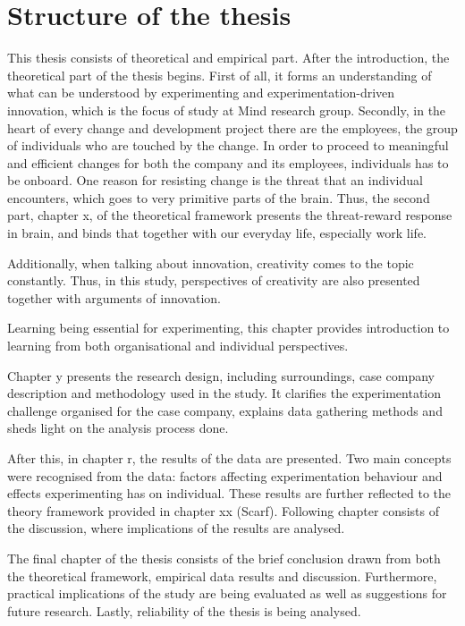 \section{Structure of the thesis}
This thesis consists of theoretical and empirical part. After the introduction, the theoretical part of the thesis begins. First of all, it forms an understanding 
of what can be understood by experimenting and experimentation-driven innovation, which is the focus of study at Mind research group. Secondly, in the heart of 
every change and development project there are the employees, the group of individuals who are touched by the change. In order to proceed to meaningful and efficient 
changes for both the company and its employees, individuals has to be onboard.  One reason for resisting change is the threat that an individual encounters, which 
goes to very primitive parts of the brain. Thus, the second part, chapter x, of the theoretical framework presents the threat-reward response in brain, and binds 
that together with our everyday life, especially work life. 

Additionally, when talking about innovation, creativity comes to the topic constantly. Thus, in this study, perspectives of creativity are also presented together 
with arguments of innovation. 

Learning being essential for experimenting, this chapter provides introduction to learning from both organisational and individual perspectives. 

Chapter y presents the research design, including surroundings,  case company description and methodology used in the study.   It clarifies the experimentation 
challenge organised for the case company, explains data gathering methods and sheds light on the analysis process done. 

After this, in chapter r, the results of the data are presented. Two main concepts were recognised from the data: factors affecting experimentation behaviour and effects 
experimenting has on individual. These results are further reflected to the theory framework provided in chapter xx (Scarf). Following chapter consists of the discussion, 
where implications of the results are analysed. 

The final chapter of the thesis consists of the brief conclusion drawn from both the theoretical framework, empirical data results and discussion. Furthermore, practical 
implications of the study are being evaluated as well as suggestions for future research. Lastly, reliability of the thesis is being analysed. 
